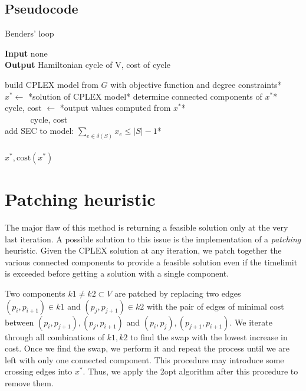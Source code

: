 \subsection{Pseudocode}
\begin{algorithm}[h]
    \caption{Benders' loop}

    \textbf{Input} none\\
    \textbf{Output} Hamiltonian cycle of V, cost of cycle\\
    \begin{algorithmic}

        \State *build CPLEX model from $G$ with objective function and degree constraints*\\
            \State $x^* \gets$ *solution of CPLEX model*
            \State *determine connected components of $x^*$*\\

                \State cycle, cost $\gets$ *output values computed from $x^*$*\\
                $\quad\;\;\quad\;\;$\Return cycle, cost
            \EndIf\\

                \State *add SEC to model: $\sum_{e\in\delta(S)}x_e\leq|S|-1$*
            \EndFor
        \EndWhile\\\\

        \Return $x^*, \text{cost}(x^*)$

    \end{algorithmic}
\end{algorithm}
\FloatBarrier

\section{Patching heuristic}
The major flaw of this method is returning a feasible solution only at the very last iteration. A possible solution to this issue is the implementation of a \textit{patching} heuristic. Given the CPLEX solution at any iteration, we patch together the various connected components to provide a feasible solution even if the timelimit is exceeded before getting a solution with a single component.

Two components $k1\neq k2\subset V$ are patched by replacing two edges $(p_i, p_{i+1})\in k1$ and $(p_j, p_{j+1})\in k2$ with the pair of edges of minimal cost between $(p_i,p_{j+1}),(p_j, p_{i+1})$ and $(p_i,p_j), (p_{j+1},p_{i+1})$. We iterate through all combinations of $k1,k2$ to find the swap with the lowest increase in cost. Once we find the swap, we perform it and repeat the process until we are left with only one connected component. This procedure may introduce some crossing edges into $x^*$. Thus, we apply the 2opt algorithm after this procedure to remove them.

